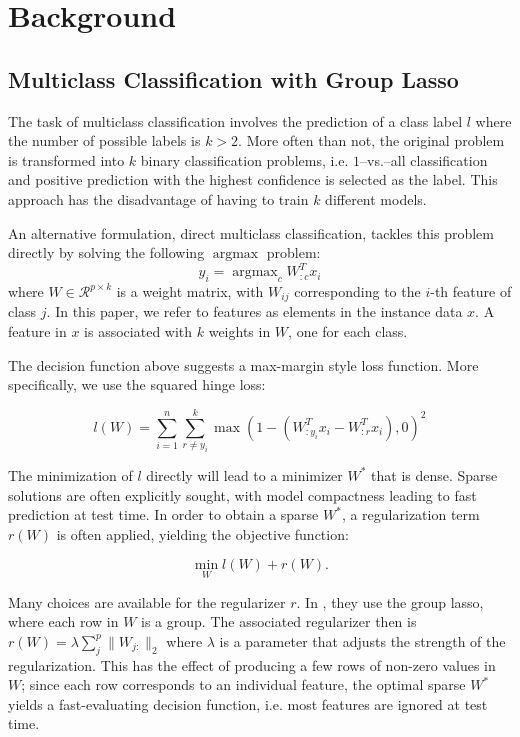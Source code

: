 \documentclass[11pt]{article}
\begin{document}
\section{Background}


\subsection{Multiclass Classification with Group Lasso}

The task of multiclass classification involves the prediction of a class label
$l$ where the number of possible labels is $k>2$. More often than not, the 
original problem is transformed into $k$ binary classification problems, i.e.
$1$--vs.--all classification and positive prediction with the highest 
confidence is selected as the label. This approach has the disadvantage of
having to train $k$ different models.

An alternative formulation, direct multiclass classification, tackles this 
problem directly by solving the following $\operatorname{argmax}$ problem:
$$y_i = \operatorname{argmax}_c W_{:c}^T x_i $$
where $W \in \mathcal{R}^{p \times k}$ is a weight matrix, with $W_{ij}$
corresponding to the $i$-th feature of class $j$. In this paper, we refer
to features as elements in the instance data $x$. A feature in $x$ is
associated with $k$ weights in $W$, one for each class.


The decision function above suggests a max-margin style loss function. More
specifically, we use the squared hinge loss:

$$ l(W) = \sum_{i=1}^n \sum_{r\ne y_i}^k 
    \max\left(1 - (W_{:y_i}^Tx_i - W_{:r}^Tx_i), 0\right)^2 $$

The minimization of $l$ directly will lead to a minimizer $W^*$ that is
dense. Sparse solutions are often explicitly sought, with model compactness
leading to fast prediction at test time. In order to obtain a sparse $W^*$,
a regularization term $r(W)$ is often applied, yielding the objective 
function:

$$\min_W l(W) + r(W).$$

Many choices are available for the regularizer $r$. In \cite{blondel2013block}, they use
the group lasso, where each row in $W$ is a group. The associated regularizer 
then is $r(W) = \lambda\sum_j^p \|W_{j:}\|_2$ where $\lambda$ is a parameter
that adjusts the strength of the regularization.
This has the effect of producing a few rows of non-zero values in $W$;
since each row corresponds to an individual feature, the optimal sparse $W^*$
yields a fast-evaluating decision function, i.e. most features are 
ignored at test time.
\end{document}
